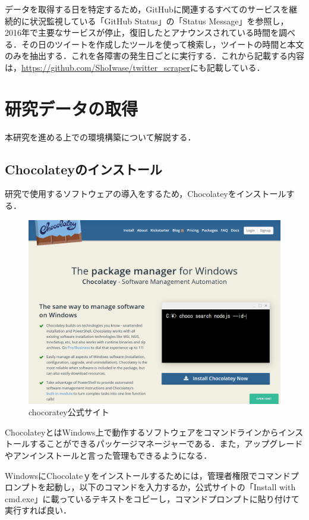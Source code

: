データを取得する日を特定するため，GitHubに関連するすべてのサービスを継続的に状況監視している「GitHub Status」の「Status Message」を参照し，2016年で主要なサービスが停止，復旧したとアナウンスされている時間を調べる．その日のツイートを作成したツールを使って検索し，ツイートの時間と本文のみを抽出する．これを各障害の発生日ごとに実行する．これから記載する内容は，\url{https://github.com/ShoIwase/twitter_scraper}にも記載している．



\newpage
\section{研究データの取得}

本研究を進める上での環境構築について解説する．

\subsection{Chocolateyのインストール}
研究で使用するソフトウェアの導入をするため，Chocolateyをインストールする．

\begin{figure}[htb]
\centering
\includegraphics[width=13cm]{img/choco1.png}
\caption{chocoratey公式サイト}
\end{figure}

ChocolateyとはWindows上で動作するソフトウェアをコマンドラインからインストールすることができるパッケージマネージャーである．また，アップグレードやアンインストールと言った管理もできるようになる．

\newpage
WindowsにChocolateｙをインストールするためには，管理者権限でコマンドプロンプトを起動し，以下のコマンドを入力するか，公式サイトの「Install with cmd.exe」に載っているテキストをコピーし，コマンドプロンプトに貼り付けて実行すれば良い．


